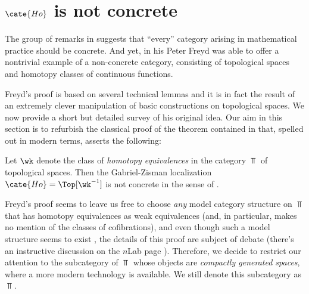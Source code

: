 \section{$\cate{Ho}$ is not concrete}
The group of remarks in  suggests that ``every'' category arising in mathematical practice should be concrete. And yet, in his \cite{fconc} Peter Freyd was able to offer a nontrivial example of a non-concrete category, consisting of topological spaces and homotopy classes of continuous functions.

Freyd's proof is based on several technical lemmas and it is in fact the result of an extremely clever manipulation of basic constructions on topological spaces. We now provide a short but detailed survey of his original idea.
Our aim in this section is to refurbish the classical proof of the theorem contained in \cite{fconc} that, spelled out in modern terms, asserts the following:
\begin{theorem}\label{honoconc}
Let $\wk$ denote the class of \emph{homotopy equivalences} in the category $\Top$ of topological spaces. Then the Gabriel-Zisman localization \cite{GZ} $\cate{Ho}=\Top[\wk^{-1}]$ is not concrete in the sense of \adef{}.
\end{theorem}
\begin{remark}
Freyd's proof seems to leave us free to choose \emph{any} model category structure on $\Top$ that has homotopy equivalences as weak equivalences (and, in particular, \cite{fconc} makes no mention of the classes of cofibrations), and even though such a model structure seems to exist \cite{strom1972homotopy}, the details of this proof are subject of debate (there's an instructive discussion on the $n$Lab page \cite{nlabstrommodel}). Therefore, we decide to restrict our attention to the subcategory of $\Top$ whose objects are \emph{compactly generated spaces}, where a more modern technology is available. We still denote this subcategory as $\Top$.
\end{remark}
